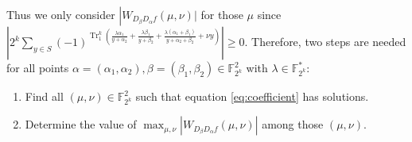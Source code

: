 \documentclass{article}
\newcommand{\F}{\mathbb{F}}
\newcommand{\TRACE}{\operatorname{Tr}_1^k}
\theoremstyle{nonumberplain}
\newcommand{\0}{\textbf{0}}
\newcommand{\1}{\textbf{1}}
\begin{document}
    Thus we only consider $ \left\lvert W_{D_{\beta}D_{\alpha}f}(\mu,\nu)\rvert\right. $ for those $ \mu $ 
    since 
    $ \left\lvert 2^k\sum_{y\in S}(-1)^{\TRACE\left(\frac{\lambda\alpha_1}{y+\alpha_2}+\frac{\lambda\beta_1}{y+\beta_2}+\frac{\lambda(\alpha_1+\beta_1)}{y+\alpha_2+\beta_2}+\nu y\right)}\right\rvert \ge 0 $.
    Therefore, two steps are needed for all points 
    $ \alpha=(\alpha_1,\alpha_2),\beta=(\beta_1,\beta_2)\in\F_{2^k}^2 $ with $ \lambda\in\F_{2^k}^* $:  
    \begin{enumerate}[label=\roman{*})]
        \item Find all $ (\mu,\nu)\in\F_{2^k}^2 $ such that equation \eqref{eq:coefficient}
        has solutions.
        \item Determine the value of $ \max_{\mu,\nu}|W_{D_{\beta}D_{\alpha}f}(\mu,\nu)| $ among those $ (\mu,\nu) $.
    \end{enumerate} 
    
\end{document}
